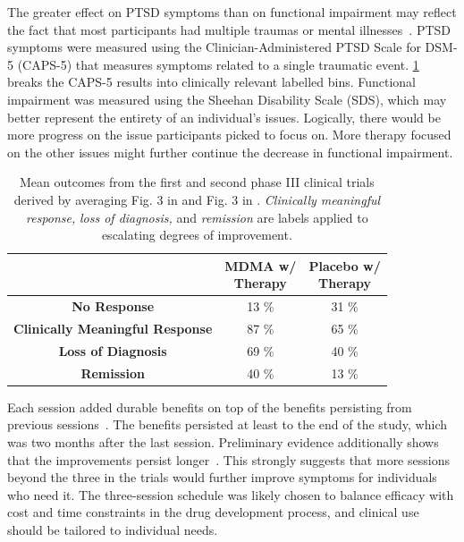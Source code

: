 \documentclass[11pt,oneside]{book}
\let\cite\parencite
\begin{document}
The greater effect on PTSD symptoms than on functional impairment may reflect the fact that most participants had multiple traumas or mental illnesses~\cite{mitchellMDMAClinicalTrial,mitchellMDMAClinicalTrial2}. PTSD symptoms were measured using the Clinician-Administered PTSD Scale for DSM-5 (CAPS-5) that measures symptoms related to a single traumatic event. \cref{table:efficacy} breaks the CAPS-5 results into clinically relevant labelled bins. Functional impairment was measured using the Sheehan Disability Scale (SDS), which may better represent the entirety of an individual's issues. Logically, there would be more progress on the issue participants picked to focus on. More therapy focused on the other issues might further continue the decrease in functional impairment.

\FloatBarrier
\begin{table}[htbp]
    \centering
    \caption{Mean outcomes from the first and second phase III clinical trials derived by averaging Fig. 3 in \textcite{mitchellMDMAClinicalTrial} and Fig. 3 in \textcite{mitchellMDMAClinicalTrial2}. \textit{Clinically meaningful response,} \textit{loss of diagnosis,} and \textit{remission} are labels applied to escalating degrees of improvement.}
    \label{table:efficacy}
    \begin{tabular}{|c|c|c|}
    \hline
     & \makecell{\textbf{MDMA w/}\\\textbf{Therapy}} & \makecell{\textbf{Placebo w/}\\\textbf{Therapy}} \\ \hline
    \textbf{No Response}          & 13 \%          & 31 \%          \\ \hline
    \textbf{Clinically Meaningful Response}          & 87 \%          & 65 \%         \\ \hline
    \textbf{Loss of Diagnosis} & 69 \% & 40 \% \\ \hline
    \textbf{Remission}          & 40 \%          & 13 \%          \\ \hline
    \end{tabular}
\end{table}
\FloatBarrier

Each session added durable benefits on top of the benefits persisting from previous sessions~\cite{mitchellMDMAClinicalTrial,mitchellMDMAClinicalTrial2}. The benefits persisted at least to the end of the study, which was two months after the last session. Preliminary evidence additionally shows that the improvements persist longer~\cite{mplongPreliminary,monashMDMA}. This strongly suggests that more sessions beyond the three in the trials would further improve symptoms for individuals who need it. The three-session schedule was likely chosen to balance efficacy with cost and time constraints in the drug development process, and clinical use should be tailored to individual needs.
\end{document}
